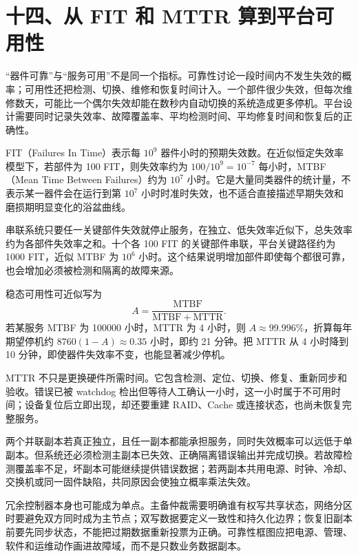\section{十四、从 FIT 和 MTTR 算到平台可用性}

“器件可靠”与“服务可用”不是同一个指标。可靠性讨论一段时间内不发生失效的概率；可用性还把检测、切换、维修和恢复时间计入。一个部件很少失效，但每次维修数天，可能比一个偶尔失效却能在数秒内自动切换的系统造成更多停机。平台设计需要同时记录失效率、故障覆盖率、平均检测时间、平均修复时间和恢复后的正确性。


FIT（Failures In Time）表示每 $10^9$ 器件小时的预期失效数。在近似恒定失效率模型下，若部件为 100 FIT，则失效率约为 $100/10^9=10^{-7}$ 每小时，MTBF（Mean Time Between Failures）约为 $10^7$ 小时。它是大量同类器件的统计量，不表示某一器件会在运行到第 $10^7$ 小时时准时失效，也不适合直接描述早期失效和磨损期明显变化的浴盆曲线。

串联系统只要任一关键部件失效就停止服务，在独立、低失效率近似下，总失效率约为各部件失效率之和。十个各 100 FIT 的关键部件串联，平台关键路径约为 1000 FIT，近似 MTBF 为 $10^6$ 小时。这个结果说明增加部件即使每个都很可靠，也会增加必须被检测和隔离的故障来源。


稳态可用性可近似写为
\[
A=\frac{\mathrm{MTBF}}{\mathrm{MTBF}+\mathrm{MTTR}}.
\]
若某服务 MTBF 为 100000 小时，MTTR 为 4 小时，则 $A\approx99.996\%$，折算每年期望停机约 $8760(1-A)\approx0.35$ 小时，即约 21 分钟。把 MTTR 从 4 小时降到 10 分钟，即使器件失效率不变，也能显著减少停机。

MTTR 不只是更换硬件所需时间。它包含检测、定位、切换、修复、重新同步和验收。错误已被 watchdog 检出但等待人工确认一小时，这一小时属于不可用时间；设备复位后立即出现，却还要重建 RAID、Cache 或连接状态，也尚未恢复完整服务。


两个并联副本若真正独立，且任一副本都能承担服务，同时失效概率可以远低于单副本。但系统还必须检测主副本已失效、正确隔离错误输出并完成切换。若故障检测覆盖率不足，坏副本可能继续提供错误数据；若两副本共用电源、时钟、冷却、交换机或同一固件缺陷，共同原因会使独立概率乘法失效。

冗余控制器本身也可能成为单点。主备仲裁需要明确谁有权写共享状态，网络分区时要避免双方同时成为主节点；双写数据要定义一致性和持久化边界；恢复旧副本前要先同步状态，不能把过期数据重新投票为正确。可靠性框图应把电源、管理、软件和运维动作画进故障域，而不是只数业务数据副本。

